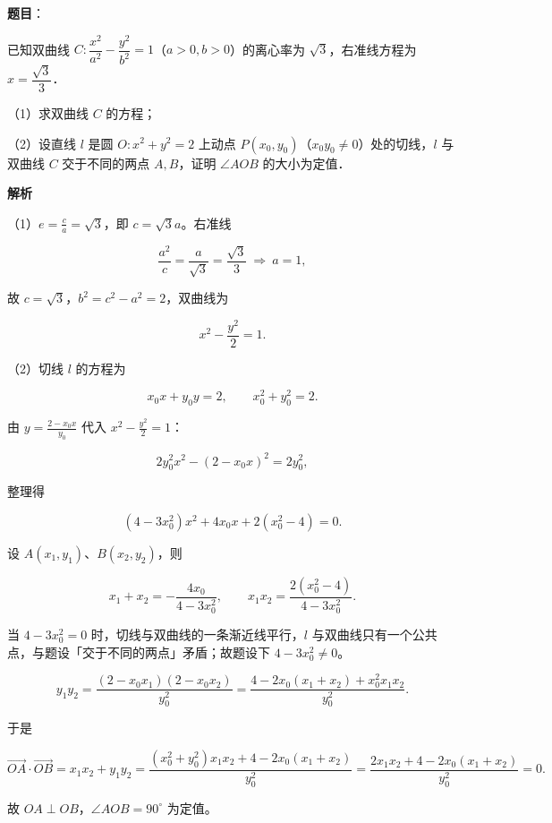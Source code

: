 \begin{answer}

\textbf{题目}：

已知双曲线 $C:\dfrac{x^2}{a^2}-\dfrac{y^2}{b^2}=1$（$a>0,b>0$）的离心率为 $\sqrt3$，右准线方程为 $x=\dfrac{\sqrt3}{3}$．

（1）求双曲线 $C$ 的方程；

（2）设直线 $l$ 是圆 $O:x^2+y^2=2$ 上动点 $P(x_0,y_0)$（$x_0y_0\neq0$）处的切线，$l$ 与双曲线 $C$ 交于不同的两点 $A,B$，证明 $\angle AOB$ 的大小为定值．

\textbf{解析}

（1）$e=\frac ca=\sqrt3$，即 $c=\sqrt3a$。右准线

\nopagebreak[4]
\[\frac{a^2}{c}=\frac{a}{\sqrt3}=\frac{\sqrt3}{3}\ \Longrightarrow\ a=1,\]

故 $c=\sqrt3$，$b^2=c^2-a^2=2$，双曲线为

\nopagebreak[4]
\[x^2-\frac{y^2}{2}=1 .\]

（2）切线 $l$ 的方程为

\nopagebreak[4]
\[x_0x+y_0y=2,\qquad x_0^2+y_0^2=2 .\]

由 $y=\frac{2-x_0x}{y_0}$ 代入 $x^2-\frac{y^2}{2}=1$：

\nopagebreak[4]
\[2y_0^2x^2-(2-x_0x)^2=2y_0^2,\]

整理得

\nopagebreak[4]
\[(4-3x_0^2)x^2+4x_0x+2(x_0^2-4)=0 .\]

设 $A(x_1,y_1)$、$B(x_2,y_2)$，则

\nopagebreak[4]
\[x_1+x_2=-\frac{4x_0}{4-3x_0^2},\qquad
x_1x_2=\frac{2(x_0^2-4)}{4-3x_0^2}.\]

\begin{gktip}
当 $4-3x_0^2=0$ 时，切线与双曲线的一条渐近线平行，$l$ 与双曲线只有一个公共点，与题设「交于不同的两点」矛盾；故题设下 $4-3x_0^2\neq0$。
\end{gktip}

\nopagebreak[4]
\[y_1y_2=\frac{(2-x_0x_1)(2-x_0x_2)}{y_0^2}
=\frac{4-2x_0(x_1+x_2)+x_0^2x_1x_2}{y_0^2}.\]

于是

\nopagebreak[4]
\[\overrightarrow{OA}\cdot\overrightarrow{OB}
=x_1x_2+y_1y_2
=\frac{(x_0^2+y_0^2)x_1x_2+4-2x_0(x_1+x_2)}{y_0^2}
=\frac{2x_1x_2+4-2x_0(x_1+x_2)}{y_0^2}=0 .\]

故 $OA\perp OB$，$\angle AOB=90^\circ$ 为定值。


\end{answer}
